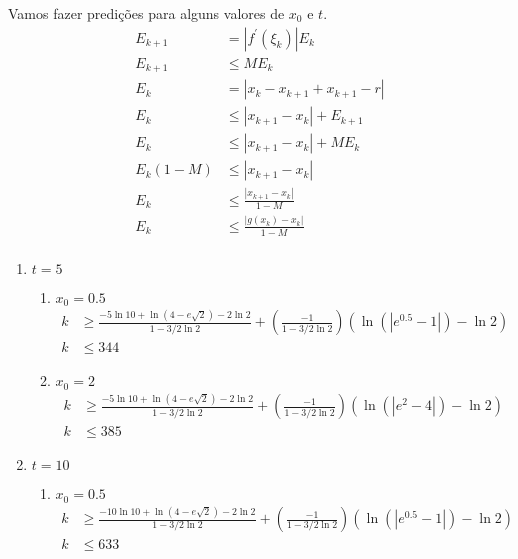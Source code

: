 \documentclass{article}
\begin{document}
    Vamos fazer predições para alguns valores de $x_0$ e $t$.
    \begin{align*}
        E_{k + 1} &= |f^\prime(\xi_k)|E_k\\
        E_{k + 1} & \leq M E_k\\
        E_{k} &= |x_k - x_{k+1} + x_{k+1} - r|\\
        E_{k} &\leq |x_{k+1} - x_k| + E_{k + 1}\\
        E_{k} &\leq |x_{k+1} - x_k| + M E_k\\
        E_{k}(1 - M) &\leq |x_{k+1} - x_k|\\
        E_{k} &\leq \frac{|x_{k+1} - x_k|}{1-M}\\
        E_{k} &\leq \frac{|g(x_k) - x_k|}{1-M}\\
    \end{align*}
    \begin{enumerate}
    \item $t = 5$
        \begin{enumerate}
            \item $x_0 = 0.5$
            \begin{align*}
                 k &\geq \frac{-5 \ln 10 + \ln(4 - e\sqrt{2}) - 2\ln 2}{1 - 3/2 \ln 2} +
                \left(\frac{-1}{1 - 3/2 \ln 2}\right)(\ln(|e^{0.5} - 1|) - \ln 2)\\
                k &\leq 344
            \end{align*}

            \item $x_0 = 2$
             \begin{align*}
                 k &\geq \frac{-5 \ln 10 + \ln(4 - e\sqrt{2}) - 2\ln 2}{1 - 3/2 \ln 2} +
                \left(\frac{-1}{1 - 3/2 \ln 2}\right)(\ln(|e^2 - 4|) - \ln 2)\\
                k &\leq 385
            \end{align*}
        \end{enumerate}
        
        \item $t = 10$
        \begin{enumerate}
            \item $x_0 = 0.5$
            \begin{align*}
                 k &\geq \frac{-10 \ln 10 + \ln(4 - e\sqrt{2}) - 2\ln 2}{1 - 3/2 \ln 2} +
                \left(\frac{-1}{1 - 3/2 \ln 2}\right)(\ln(|e^{0.5} - 1|) - \ln 2)\\
                k &\leq 633
            \end{align*}


\end{enumerate}
\end{enumerate}
\end{document}
